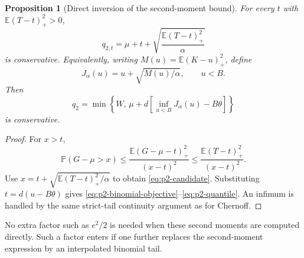 \documentclass[11pt,letterpaper]{article}
\numberwithin{equation}{section}
\newtheorem{proposition}[theorem]{Proposition}
\theoremstyle{definition}
\theoremstyle{remark}
\begin{document}
\par\noindent\begin{minipage}{\linewidth}
\begin{proposition}[Direct inversion of the second-moment bound]
\label{prop:p2-quantile}
For every $t$ with $\mathbb{E}(T-t)_+^2>0$,
\begin{equation}
  q_{2,t}=\mu+t+
       \sqrt{\frac{\mathbb{E}(T-t)_+^2}{\alpha}}
  \label{eq:p2-candidate}
\end{equation}
is conservative. Equivalently, writing
$M(u)=\mathbb{E}(K-u)_+^2$, define
\begin{equation}
  J_\alpha(u)=u+\sqrt{M(u)/\alpha},\qquad u<B.
  \label{eq:p2-binomial-objective}
\end{equation}
Then
\begin{equation}
  q_2=\min\left\{W,\,
       \mu+d\left[\inf_{u<B}J_\alpha(u)-B\theta\right]\right\}
  \label{eq:p2-quantile}
\end{equation}
is conservative.
\end{proposition}
\end{minipage}\par
\begin{proof}
For $x>t$,
\[
  \mathbb{P}(G-\mu>x)
  \le\frac{\mathbb{E}(G-\mu-t)_+^2}{(x-t)^2}
  \le\frac{\mathbb{E}(T-t)_+^2}{(x-t)^2}.
\]
Use $x=t+\sqrt{\mathbb{E}(T-t)_+^2/\alpha}$ to obtain
\eqref{eq:p2-candidate}. Substituting $t=d(u-B\theta)$ gives
\eqref{eq:p2-binomial-objective}--\eqref{eq:p2-quantile}. An infimum is
handled by the same strict-tail continuity argument as for Chernoff.
\end{proof}

No extra factor such as $e^2/2$ is needed when these second moments are
computed directly. Such a factor enters if one further replaces the
second-moment expression by an interpolated binomial tail.
\end{document}
